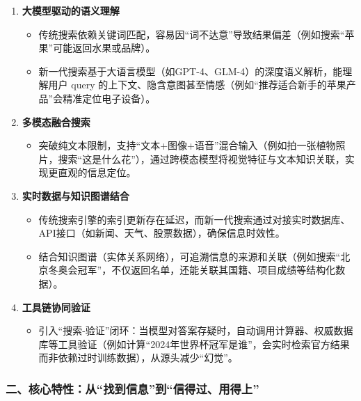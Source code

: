 \begin{enumerate}
    \item \textbf{大模型驱动的语义理解}  
    \begin{itemize}
        \item 传统搜索依赖关键词匹配，容易因“词不达意”导致结果偏差（例如搜索“苹果”可能返回水果或品牌）。  
        \item 新一代搜索基于大语言模型（如GPT-4、GLM-4）的深度语义解析，能理解用户 query 的上下文、隐含意图甚至情感（例如“推荐适合新手的苹果产品”会精准定位电子设备）。  
    \end{itemize}

    \item \textbf{多模态融合搜索}  
    \begin{itemize}
        \item 突破纯文本限制，支持“文本+图像+语音”混合输入（例如拍一张植物照片，搜索“这是什么花”），通过跨模态模型将视觉特征与文本知识关联，实现更直观的信息定位。  
    \end{itemize}

    \item \textbf{实时数据与知识图谱结合}  
    \begin{itemize}
        \item 传统搜索引擎的索引更新存在延迟，而新一代搜索通过对接实时数据库、API接口（如新闻、天气、股票数据），确保信息时效性。  
        \item 结合知识图谱（实体关系网络），可追溯信息的来源和关联（例如搜索“北京冬奥会冠军”，不仅返回名单，还能关联其国籍、项目成绩等结构化数据）。  
    \end{itemize}

    \item \textbf{工具链协同验证}  
    \begin{itemize}
        \item 引入“搜索-验证”闭环：当模型对答案存疑时，自动调用计算器、权威数据库等工具验证（例如计算“2024年世界杯冠军是谁”，会实时检索官方结果而非依赖过时训练数据），从源头减少“幻觉”。  
    \end{itemize}
\end{enumerate}

\subsubsection*{二、核心特性：从“找到信息”到“信得过、用得上”}


